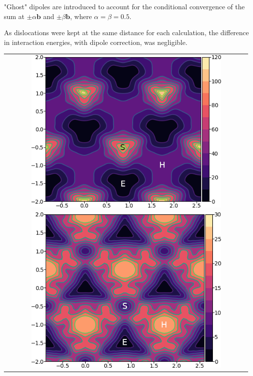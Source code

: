 \documentclass[a4paper]{article}
\begin{document}
"Ghost" dipoles are introduced to account for the conditional convergence
of the sum at \(\pm\alpha \mathbf{b}\) and \(\pm \beta\mathbf{b}\), where \(\alpha = \beta = 0.5\).  


As dislocations were kept at the same distance for each
calculation, the difference in interaction energies, with dipole correction, was negligible. 



        \begin{table}
    \begin{tabular}{c}
	     \includegraphics[width=0.8\textwidth]{../Images/itakura_dislocation_energy_landscape_2_labelled.png} \\
             \includegraphics[width=0.8\textwidth]{../Images/tbe_dislocation_energy_landscape_pure_labelled.png}  \\
    \end{tabular}		

\end{table}
\end{document}
